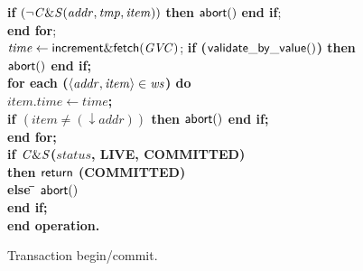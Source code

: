 \begin{figure} [htb]
{{\begin{minipage}[t]{1\linewidth}
\begin{tabbing}
 \>\> {\bf if} $(\neg {\sf \mathit{C\&S}}(\mathit{addr, tmp, item}))$ {\bf then} $\sf{abort}()$ {\bf end if}; \\

 \> {\bf end for}; \\

 \> $\mathit{time} \gets {\sf increment\&fetch}(\mathit{GVC})$; \bf{if} (${\sf validate\_by\_value}()$) {\bf then} $\sf{abort}()$ {\bf end if}; \\




 \> 
{\bf for each} ($\left \langle \mathit{addr, item} \right \rangle  \in \mathit{ws}$) {\bf do} \\
 \>\> $\mathit{item.time} \gets \mathit{time}$; \\
 \>\> {\bf if} $(\mathit{item} \neq (\downarrow \mathit{addr}))$  
                 {\bf then}  
		    $\sf{abort}()$
                {\bf end if}; \\

 \> {\bf end for}; \\
 \> {\bf if} ${\sf \mathit{C\&S}}$($\mathit{status}$, LIVE, COMMITTED) \\
 \>\> {\bf then} \> ${\sf return}$ (COMMITTED)\\
 \> \> {\bf else} \= ${\sf abort}()$ \\
 \> {\bf end if};  \\
{\bf end operation}.

\end{tabbing}
\normalsize
\end{minipage}
}
\caption{Transaction begin/commit.}
\label{fig:tbc}
}
\end{figure}

